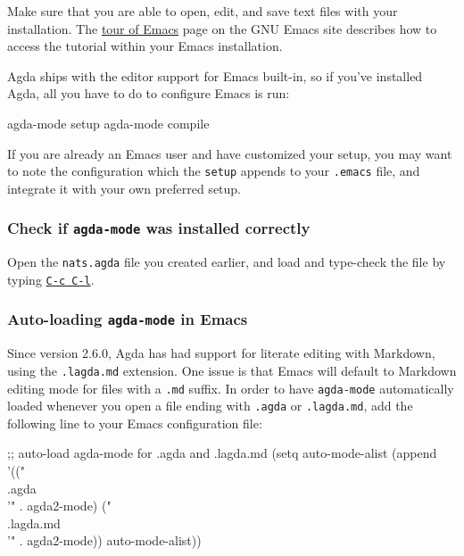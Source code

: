 Make sure that you are able to open, edit, and save text files with your
installation. The \href{https://www.gnu.org/software/emacs/tour/}{tour
of Emacs} page on the GNU Emacs site describes how to access the
tutorial within your Emacs installation.

Agda ships with the editor support for Emacs built-in, so if you've
installed Agda, all you have to do to configure Emacs is run:

\begin{myDisplay}
agda-mode setup
agda-mode compile
\end{myDisplay}

If you are already an Emacs user and have customized your setup, you may
want to note the configuration which the \texttt{setup} appends to your
\texttt{.emacs} file, and integrate it with your own preferred setup.

\hypertarget{check-if-agda-mode-was-installed-correctly}{%
\subsubsection{\texorpdfstring{Check if \texttt{agda-mode} was installed
correctly}{Check if agda-mode was installed correctly}}\label{check-if-agda-mode-was-installed-correctly}}

Open the \texttt{nats.agda} file you created earlier, and load and
type-check the file by typing
\href{https://agda.readthedocs.io/en/v2.6.1.3/tools/emacs-mode.html\#notation-for-key-combinations}{\texttt{C-c\ C-l}}.

\hypertarget{auto-loading-agda-mode-in-emacs}{%
\subsubsection{\texorpdfstring{Auto-loading \texttt{agda-mode} in
Emacs}{Auto-loading agda-mode in Emacs}}\label{auto-loading-agda-mode-in-emacs}}

Since version 2.6.0, Agda has had support for literate editing with
Markdown, using the \texttt{.lagda.md} extension. One issue is that
Emacs will default to Markdown editing mode for files with a
\texttt{.md} suffix. In order to have \texttt{agda-mode} automatically
loaded whenever you open a file ending with \texttt{.agda} or
\texttt{.lagda.md}, add the following line to your Emacs configuration
file:

\begin{myDisplay}
;; auto-load agda-mode for .agda and .lagda.md
(setq auto-mode-alist
   (append
     '(("\\.agda\\'" . agda2-mode)
       ("\\.lagda.md\\'" . agda2-mode))
     auto-mode-alist))
\end{myDisplay}

